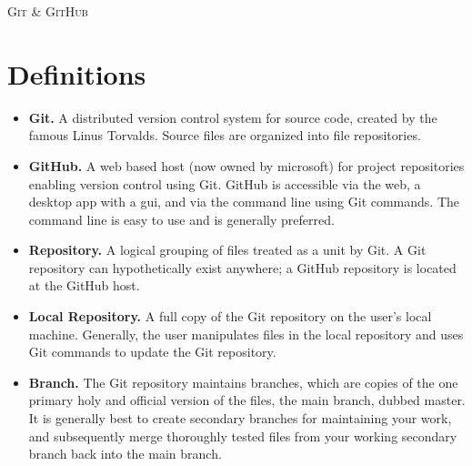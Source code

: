 \documentclass[10pt]{article}
\begin{document}
\thispagestyle{empty}
\pagestyle{empty}

\begin{center}\textsc{\Large Git \& GitHub}\end{center}

\section{Definitions}
\begin{itemize}
	\item \textbf{Git.} A distributed version control system for source code, created by the famous Linus Torvalds.  Source files are organized into file repositories.
	\item \textbf{GitHub.} A web based host (now owned by microsoft) for project repositories enabling version control using Git.  GitHub is accessible via the web, a desktop app with a gui, and via the command line using Git commands.
		The command line is easy to use and is generally preferred.
	\item \textbf{Repository.} A logical grouping of files treated as a unit by Git.  A Git repository can hypothetically exist anywhere;  a GitHub repository is located at the GitHub host.
	\item \textbf{Local Repository.} A full copy of the Git repository on the user's local machine.  Generally, the user manipulates files in the local repository and uses Git commands to update the Git repository.
	\item \textbf{Branch.} The Git repository maintains branches, which are copies of the one primary holy and official version of the files, the main branch, dubbed master.  It is generally best to create secondary branches for
		maintaining your work, and subsequently merge thoroughly tested files from your working secondary branch back into the main branch.
\end{itemize}
\end{document}
